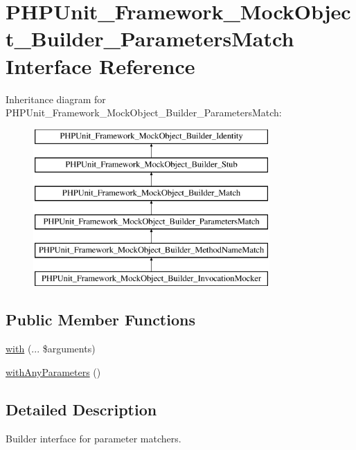 \hypertarget{interface_p_h_p_unit___framework___mock_object___builder___parameters_match}{}\section{P\+H\+P\+Unit\+\_\+\+Framework\+\_\+\+Mock\+Object\+\_\+\+Builder\+\_\+\+Parameters\+Match Interface Reference}
\label{interface_p_h_p_unit___framework___mock_object___builder___parameters_match}
Inheritance diagram for P\+H\+P\+Unit\+\_\+\+Framework\+\_\+\+Mock\+Object\+\_\+\+Builder\+\_\+\+Parameters\+Match\+:\begin{figure}[H]
\begin{center}
\leavevmode
\includegraphics[height=6.000000cm]{interface_p_h_p_unit___framework___mock_object___builder___parameters_match}
\end{center}
\end{figure}
\subsection*{Public Member Functions}
\begin{DoxyCompactItemize}
\item 
\mbox{\hyperlink{interface_p_h_p_unit___framework___mock_object___builder___parameters_match_a9197873aa58b8efb8b5570613a05632b}{with}} (... \$arguments)
\item 
\mbox{\hyperlink{interface_p_h_p_unit___framework___mock_object___builder___parameters_match_a9d778819e7c191d54326bf56d1910d7c}{with\+Any\+Parameters}} ()
\end{DoxyCompactItemize}


\subsection{Detailed Description}
Builder interface for parameter matchers.

